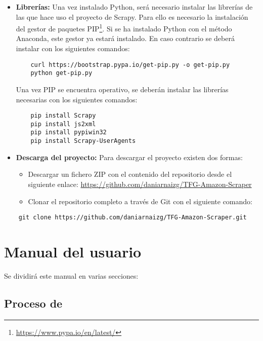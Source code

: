 \begin{itemize}
    \item \textbf{Librerías:} Una vez instalado Python, será necesario instalar las librerías de las que hace uso el proyecto de Scrapy. Para ello es necesario la instalación del gestor de paquetes PIP\footnote{\url{https://www.pypa.io/en/latest/}}. Si se ha instalado Python con el método Anaconda, este gestor ya estará instalado. En caso contrario se deberá instalar con los siguientes comandos:
    
\begin{verbatim}
    curl https://bootstrap.pypa.io/get-pip.py -o get-pip.py
    python get-pip.py
\end{verbatim}

    Una vez PIP se encuentra operativo, se deberán instalar las librerías necesarias con los siguientes comandos:
    \begin{verbatim}
    pip install Scrapy
    pip install js2xml
    pip install pypiwin32
    pip install Scrapy-UserAgents
    \end{verbatim}
    
    \item \textbf{Descarga del proyecto:} Para descargar el proyecto existen dos formas:
    \begin{itemize}
        \item Descargar un fichero ZIP con el contenido del repositorio desde el siguiente enlace:
        \newline
        \url{https://github.com/daniarnaizg/TFG-Amazon-Scraper}
        
        
        \item Clonar el repositorio completo a través de Git con el siguiente comando:
    \end{itemize}
\end{itemize}

\begin{verbatim}
    git clone https://github.com/daniarnaizg/TFG-Amazon-Scraper.git
\end{verbatim}

\section{Manual del usuario}

Se dividirá este manual en varias secciones:

\subsection{Proceso de }

